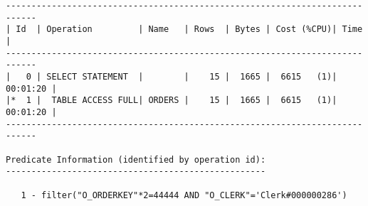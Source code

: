 \documentclass[11pt,a4paper,parskip=half]{scrartcl}
\begin{document}
\begin{lstlisting}
----------------------------------------------------------------------------                                                                                                                                                                                                                                 
| Id  | Operation         | Name   | Rows  | Bytes | Cost (%CPU)| Time     |                                                                                                                                                                                                                                 
----------------------------------------------------------------------------                                                                                                                                                                                                                                 
|   0 | SELECT STATEMENT  |        |    15 |  1665 |  6615   (1)| 00:01:20 |                                                                                                                                                                                                                                 
|*  1 |  TABLE ACCESS FULL| ORDERS |    15 |  1665 |  6615   (1)| 00:01:20 |                                                                                                                                                                                                                                 
----------------------------------------------------------------------------                                                                                                                                                                                                                                 
                                                                                                                                                                                                                                                                                                             
Predicate Information (identified by operation id):                                                                                                                                                                                                                                                          
---------------------------------------------------                                                                                                                                                                                                                                                          
                                                                                                                                                                                                                                                                                                             
   1 - filter("O_ORDERKEY"*2=44444 AND "O_CLERK"='Clerk#000000286')  
\end{lstlisting}
\end{document}
